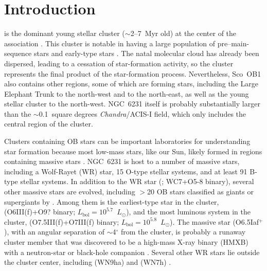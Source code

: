 \documentclass[twocolumn,tighten]{aastex61}
\begin{document}

\section{Introduction}

 is the dominant young stellar cluster ($\sim$2--7~Myr old) at the center of the  association \citep[$d\approx1.59$~kpc;][]{1998AJ....115..734S}. This cluster is notable in having a large population of pre--main-sequence stars and early-type stars \citep{1998AJ....115..734S,2008hsf2.book..401R,2007MNRAS.377..945S,2016arXiv160708860D}. The natal molecular cloud has already been dispersed, leading to a cessation of star-formation activity, so the cluster represents the final product of the star-formation process. Nevertheless, Sco~OB1 also contains other regions, some of which are forming stars, including the Large Elephant Trunk to the north-west and  to the north-east, as well as the young stellar cluster  to the north-west. NGC~6231 itself is probably substantially larger than the $\sim$0.1~square degrees {\it Chandra}/ACIS-I field, which only includes the central region of the cluster. 

Clusters containing OB stars can be important laboratories for understanding star formation because most low-mass stars, like our Sun, likely formed in regions containing massive stars \citep{2012A&A...545A...4G,2012ApJ...754...56D}. NGC~6231 is host to a number of massive stars, including a Wolf-Rayet (WR) star, 15 O-type stellar systems, and at least 91 B-type stellar systems. In addition to the WR star (; WC7+O5-8 binary), several other massive stars are evolved, including $>$20 OB stars classified as giants or supergiants by \citet{1978ApJS...38..309H}. Among them is the earliest-type star in the cluster,  (O6III(f)+O9? binary; $L_\mathrm{bol}=10^{5.7}$~$L_\odot$), and the most luminous system in the cluster,  (O7.5III(f)+O7III(f) binary; $L_\mathrm{bol}=10^{5.8}$~$L_\odot$). The massive star  (O6.5Iaf$^{+}$), with an angular separation of $\sim$4$^\circ$ from the cluster, is probably a runaway cluster member \citep{1974PASP...86..284F,2001A&A...370..170A} that was discovered to be a high-mass X-ray binary (HMXB) with a neutron-star or black-hole companion \citep{1973ApJ...181L..43J,2002A&A...392..909C}. Several other WR stars lie outside the cluster center, including  (WN9ha) and  (WN7h) \citep{2014AJ....147..115F}.
\end{document}
